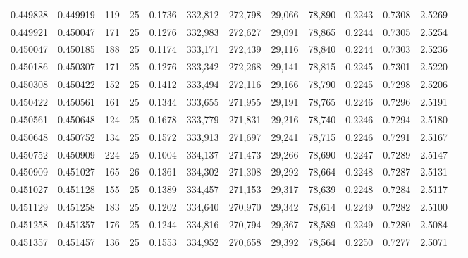 \begin{tabular}{rrrrrrrrrrrrr}
0.449828 & 0.449919 &   119 &  25 &                                     0.1736 & 332,812 & 272,798 &  29,066 &  78,890 & 0.2243 & 0.7308 & 2.5269 \\
0.449921 & 0.450047 &   171 &  25 &                                     0.1276 & 332,983 & 272,627 &  29,091 &  78,865 & 0.2244 & 0.7305 & 2.5254 \\
0.450047 & 0.450185 &   188 &  25 &                                     0.1174 & 333,171 & 272,439 &  29,116 &  78,840 & 0.2244 & 0.7303 & 2.5236 \\
0.450186 & 0.450307 &   171 &  25 &                                     0.1276 & 333,342 & 272,268 &  29,141 &  78,815 & 0.2245 & 0.7301 & 2.5220 \\
0.450308 & 0.450422 &   152 &  25 &                                     0.1412 & 333,494 & 272,116 &  29,166 &  78,790 & 0.2245 & 0.7298 & 2.5206 \\
0.450422 & 0.450561 &   161 &  25 &                                     0.1344 & 333,655 & 271,955 &  29,191 &  78,765 & 0.2246 & 0.7296 & 2.5191 \\
0.450561 & 0.450648 &   124 &  25 &                                     0.1678 & 333,779 & 271,831 &  29,216 &  78,740 & 0.2246 & 0.7294 & 2.5180 \\
0.450648 & 0.450752 &   134 &  25 &                                     0.1572 & 333,913 & 271,697 &  29,241 &  78,715 & 0.2246 & 0.7291 & 2.5167 \\
0.450752 & 0.450909 &   224 &  25 &                                     0.1004 & 334,137 & 271,473 &  29,266 &  78,690 & 0.2247 & 0.7289 & 2.5147 \\
0.450909 & 0.451027 &   165 &  26 &                                     0.1361 & 334,302 & 271,308 &  29,292 &  78,664 & 0.2248 & 0.7287 & 2.5131 \\
0.451027 & 0.451128 &   155 &  25 &                                     0.1389 & 334,457 & 271,153 &  29,317 &  78,639 & 0.2248 & 0.7284 & 2.5117 \\
0.451129 & 0.451258 &   183 &  25 &                                     0.1202 & 334,640 & 270,970 &  29,342 &  78,614 & 0.2249 & 0.7282 & 2.5100 \\
0.451258 & 0.451357 &   176 &  25 &                                     0.1244 & 334,816 & 270,794 &  29,367 &  78,589 & 0.2249 & 0.7280 & 2.5084 \\
0.451357 & 0.451457 &   136 &  25 &                                     0.1553 & 334,952 & 270,658 &  29,392 &  78,564 & 0.2250 & 0.7277 & 2.5071 \\

\end{tabular}
